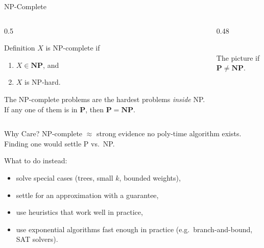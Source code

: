 \documentclass[10pt,aspectratio=169]{beamer}
\begin{document}
\begin{frame}{NP-Complete}
  \begin{columns}[c]
    \begin{column}{0.5\textwidth}
      \begin{block}{Definition}
        $X$ is \alert{NP-complete} if
        \begin{enumerate}
          \item $X \in \mathbf{NP}$, and
          \item $X$ is NP-hard.
        \end{enumerate}
      \end{block}

      \medskip
      The NP-complete problems are the hardest problems \emph{inside} NP.
      If any one of them is in $\mathbf{P}$, then $\mathbf{P} = \mathbf{NP}$.
    \end{column}
    \begin{column}{0.48\textwidth}
      \begin{center}
      \\
      \small The picture if $\mathbf{P} \ne \mathbf{NP}$.
      \end{center}
    \end{column}
  \end{columns}
\end{frame}

\begin{frame}{Why Care?}
  NP-complete $\approx$ strong evidence no poly-time algorithm exists.
  Finding one would settle P vs.\ NP.

  \bigskip
  What to do instead:
  \begin{itemize}
    \item solve \alert{special cases} (trees, small $k$, bounded weights),
    \item settle for an \alert{approximation} with a guarantee,
    \item use \alert{heuristics} that work well in practice,
    \item use exponential algorithms fast enough in practice
          (e.g.\ branch-and-bound, SAT solvers).
  \end{itemize}
\end{frame}
\end{document}
